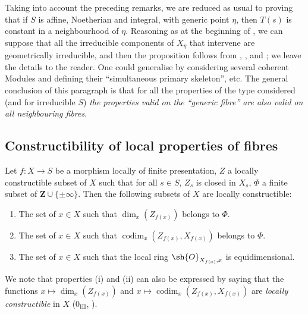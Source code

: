 \begin{remark}[9.8.9]
\medskip
Taking into account the preceding remarks, we are reduced as usual to proving that if $S$ is affine, Noetherian and integral, with generic point $\eta$, then $T(s)$ is constant in a neighbourhood of $\eta$.
Reasoning as at the beginning of , we can suppose that all the irreducible components of $X_\eta$ that intervene are geometrically irreducible, and then the proposition follows from , ,  and ; we leave the details to the reader.
One could generalise by considering several coherent Modules and defining their ``simultaneous primary skeleton'', etc.
The general conclusion of this paragraph is that for all the properties of the type considered (and for irreducible $S$) \emph{the properties valid on the ``generic fibre'' are also valid on all neighbouring fibres}.
\end{remark}

\subsection{Constructibility of local properties of fibres}
\label{subsection:IV.9.9}
\label{IV.9.9}

\begin{proposition}[9.9.1]
\label{IV.9.9.1}
Let $f:X\to S$ be a morphism locally of finite presentation, $Z$ a locally constructible subset of $X$ such that for all $s\in S$, $Z_s$ is closed in $X_s$, $\Phi$ a finite subset of $\mathbf{Z}\cup\{\pm\infty\}$.
Then the following subsets of $X$ are locally constructible:
\begin{enumerate}[label=(\roman*)]
  \item The set of $x\in X$ such that $\dim_x(Z_{f(x)})$ belongs to $\Phi$.
  \item The set of $x\in X$ such that $\operatorname{codim}_x(Z_{f(x)},X_{f(x)})$ belongs to $\Phi$.
  \item The set of $x\in X$ such that the local ring $\sh{O}_{X_{f(x)},x}$ is equidimensional.
\end{enumerate}

We note that properties (i) and (ii) can also be expressed by saying that the functions $x\mapsto\dim_x(Z_{f(x)})$ and $x\mapsto\operatorname{codim}_x(Z_{f(x)},X_{f(x)})$ are \emph{locally constructible} in $X$ ($0_{\mathrm{III}}$, ).
\end{proposition}

